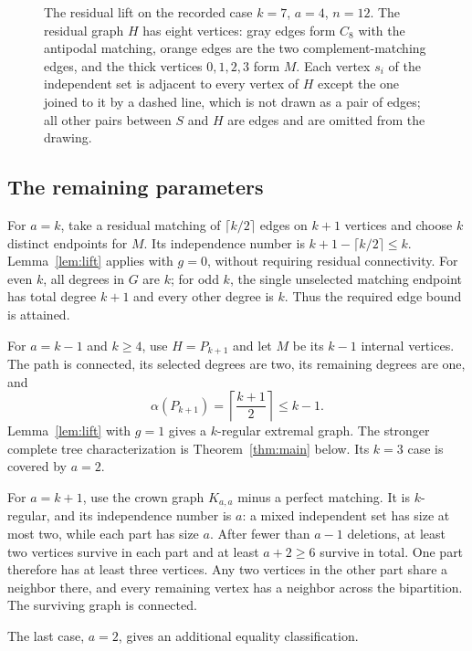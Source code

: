 \begin{figure}[ht]
\centering

\caption{The residual lift on the recorded case $k=7$, $a=4$, $n=12$. The residual graph $H$ has eight vertices: gray edges form $C_8$ with the antipodal matching, orange edges are the two complement-matching edges, and the thick vertices $0,1,2,3$ form $M$. Each vertex $s_i$ of the independent set is adjacent to every vertex of $H$ except the one joined to it by a dashed line, which is not drawn as a pair of edges; all other pairs between $S$ and $H$ are edges and are omitted from the drawing.}
\label{fig:lift}
\end{figure}

\subsection{The remaining parameters}

For $a=k$, take a residual matching of $\lceil k/2\rceil$ edges on $k+1$ vertices and choose $k$ distinct endpoints for $M$.
Its independence number is $k+1-\lceil k/2\rceil\le k$.
Lemma~\ref{lem:lift} applies with $g=0$, without requiring residual connectivity.
For even $k$, all degrees in $G$ are $k$; for odd $k$, the single unselected matching endpoint has total degree $k+1$ and every other degree is $k$.
Thus the required edge bound is attained.

For $a=k-1$ and $k\ge4$, use $H=P_{k+1}$ and let $M$ be its $k-1$ internal vertices.
The path is connected, its selected degrees are two, its remaining degrees are one, and
\begin{equation}
\alpha(P_{k+1})=\left\lceil\frac{k+1}{2}\right\rceil\le k-1.
\end{equation}
Lemma~\ref{lem:lift} with $g=1$ gives a $k$-regular extremal graph.
The stronger complete tree characterization is Theorem~\ref{thm:main} below.
Its $k=3$ case is covered by $a=2$.

For $a=k+1$, use the crown graph $K_{a,a}$ minus a perfect matching.
It is $k$-regular, and its independence number is $a$: a mixed independent set has size at most two, while each part has size $a$.
After fewer than $a-1$ deletions, at least two vertices survive in each part and at least $a+2\ge6$ survive in total.
One part therefore has at least three vertices.
Any two vertices in the other part share a neighbor there, and every remaining vertex has a neighbor across the bipartition.
The surviving graph is connected.

The last case, $a=2$, gives an additional equality classification.

